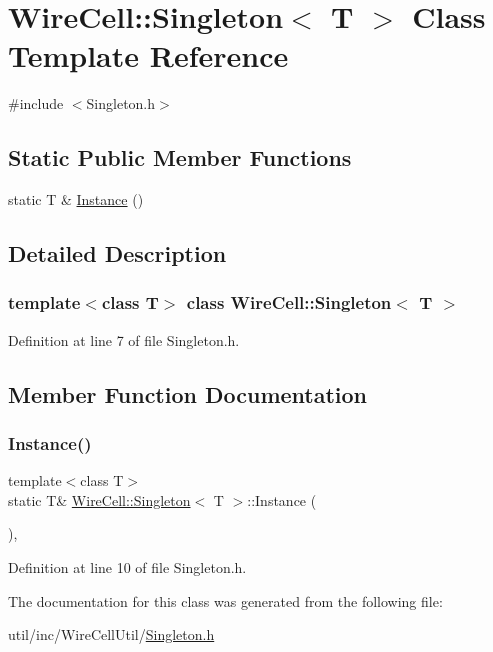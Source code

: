 \hypertarget{class_wire_cell_1_1_singleton}{}\section{Wire\+Cell\+:\+:Singleton$<$ T $>$ Class Template Reference}
\label{class_wire_cell_1_1_singleton}


{\ttfamily \#include $<$Singleton.\+h$>$}

\subsection*{Static Public Member Functions}
\begin{DoxyCompactItemize}
\item 
static T \& \hyperlink{class_wire_cell_1_1_singleton_a89dd3c3ac6fbc5d8cfdd7798563322e7}{Instance} ()
\end{DoxyCompactItemize}


\subsection{Detailed Description}
\subsubsection*{template$<$class T$>$\newline
class Wire\+Cell\+::\+Singleton$<$ T $>$}



Definition at line 7 of file Singleton.\+h.



\subsection{Member Function Documentation}
\mbox{\label{class_wire_cell_1_1_singleton_a89dd3c3ac6fbc5d8cfdd7798563322e7}} 
\subsubsection{\texorpdfstring{Instance()}{Instance()}}
{\footnotesize\ttfamily template$<$class T$>$ \\
static T\& \hyperlink{class_wire_cell_1_1_singleton}{Wire\+Cell\+::\+Singleton}$<$ T $>$\+::Instance (\begin{DoxyParamCaption}{ }\end{DoxyParamCaption})\hspace{0.3cm}{\ttfamily [inline]}, {\ttfamily [static]}}



Definition at line 10 of file Singleton.\+h.



The documentation for this class was generated from the following file\+:\begin{DoxyCompactItemize}
\item 
util/inc/\+Wire\+Cell\+Util/\hyperlink{_singleton_8h}{Singleton.\+h}\end{DoxyCompactItemize}

